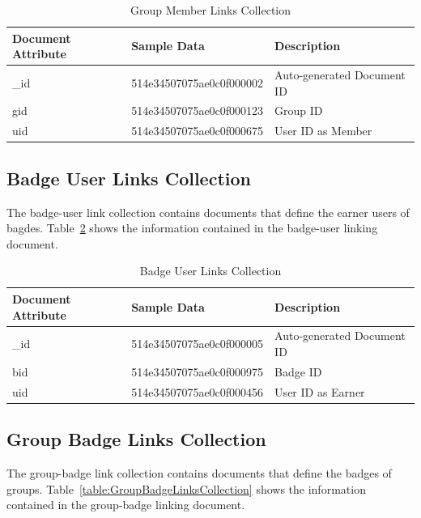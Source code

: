 \begin{table}[H]
\caption{Group Member Links Collection}\label{table:GroupMemberLinksCollection}
\vspace{-0.2in}
\textbf{ }
\begin{center}
\begin{tabular}{ | l | l |  l | }
\hline
Document Attribute & Sample Data & Description \\ \hline
{\_}id & 514e34507075ae0c0f000002 & Auto-generated Document ID \\ \hline
gid & 514e34507075ae0c0f000123 & Group ID   \\ \hline
uid & 514e34507075ae0c0f000675 & User ID as Member   \\ \hline
\end{tabular}
\end{center}
\end{table}


\subsection{Badge User Links Collection}
The badge-user link collection contains documents that define the earner users of bagdes. Table~\ref{table:BadgeUserLinksCollection} shows the information contained in the badge-user linking document.

\begin{table}[H]
\caption{Badge User Links Collection}\label{table:BadgeUserLinksCollection}
\vspace{-0.2in}
\textbf{ }
\begin{center}
\begin{tabular}{ | l | l |  l | }
\hline
Document Attribute & Sample Data & Description \\ \hline
{\_}id & 514e34507075ae0c0f000005 & Auto-generated Document ID \\ \hline
bid & 514e34507075ae0c0f000975 & Badge ID   \\ \hline
uid & 514e34507075ae0c0f000456 & User ID as Earner   \\ \hline
\end{tabular}
\end{center}
\end{table}


\subsection{Group Badge Links Collection}
The group-badge link collection contains documents that define the badges of groups. Table~\ref{table:GroupBadgeLinksCollection} shows the information contained in the group-badge linking document.


